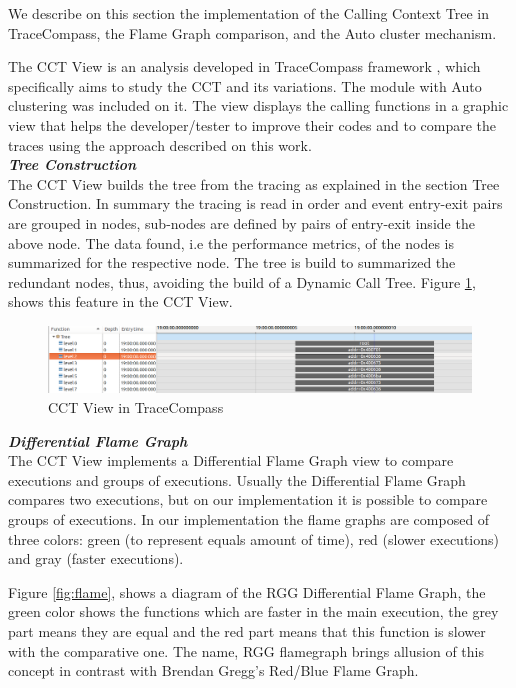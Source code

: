 We describe on this section the implementation of the Calling Context Tree in TraceCompass, the Flame Graph comparison, and the Auto cluster mechanism.

The CCT View is an analysis developed in TraceCompass framework \cite{tracecompass}, which specifically aims to study the CCT and its variations. The module with Auto clustering was included on it. The view displays the calling functions in a graphic view that helps the developer/tester to improve their codes and to compare the traces using the approach described on this work.\\

\textbf{\textit{Tree Construction}}\\
The CCT View builds the tree from the tracing as explained in the section Tree Construction. In summary the tracing is read in order and event entry-exit pairs are grouped in nodes, sub-nodes are defined by pairs of entry-exit inside the above node. The data found, i.e the performance metrics, of the nodes is summarized for the respective node. The tree is build to summarized the redundant nodes, thus, avoiding the build of a Dynamic Call Tree. Figure \ref{fig:cct_view}, shows this feature in the CCT View.\\
    
 \begin{figure}[h]
  \centering
    \includegraphics[width=2\columnwidth]{figures/cct_view.png}
    \caption{CCT View in TraceCompass }
    \label{fig:cct_view}
\end{figure}

\textbf{\textit{Differential Flame Graph}}\\
The CCT View implements a Differential Flame Graph view to compare executions and groups of executions. Usually the Differential Flame Graph compares two executions, but on our implementation it is possible to compare groups of executions. In our implementation the flame graphs are composed of three colors: green (to represent equals amount of time), red (slower executions) and gray (faster executions). 

Figure \ref{fig:flame}, shows a diagram of the RGG Differential Flame Graph, the green color shows the functions which are faster in the main execution, the grey part means they are equal and the red part means that this function is slower with the comparative one. The name, RGG flamegraph brings allusion of this concept in contrast with Brendan Gregg's Red/Blue Flame Graph. 
 
